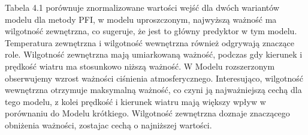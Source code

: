 \documentclass[a4paper,twoside,12pt]{book}
\begin{document}
\begin{table}[!h]
  \centering
  \caption{Porównianie ważności wejść dla metody PFI}
\end{table}
Tabela 4.1 porównuje znormalizowane wartości wejść dla dwóch wariantów modelu dla metody PFI, w modelu uproszczonym, najwyższą ważność ma wilgotność zewnętrzna, co sugeruje, że jest to główny predyktor w tym modelu. Temperatura zewnętrzna i wilgotność wewnętrzna również odgrywają znaczące role. Wilgotność zewnętrzna mają umiarkowaną ważność, podczas gdy kierunek i prędkość wiatru ma stosunkowo niższą ważność. W Modelu rozszerzonym obserwujemy wzrost ważności ciśnienia atmosferycznego. Interesująco, wilgotność wewnętrzna otrzymuje maksymalną ważność, co czyni ją najważniejszą cechą dla tego modelu, z kolei prędkość i kierunek wiatru mają większy wpływ w porównaniu do Modelu krótkiego. Wilgotność zewnętrzna doznaje znaczącego obniżenia ważności, zostajac cechą o najniższej wartości.
\newpage
\end{document}
